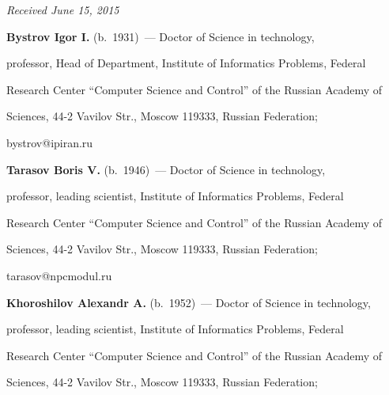 \vspace*{-1pt}





\hfill{\small\textit{Received June 15, 2015}}    


    


\Contr





\noindent


\textbf{Bystrov Igor I.} (b.\ 1931)~--- Doctor of Science in technology, 


professor, Head of Department, Institute of Informatics Problems, Federal 


Research Center ``Computer Science and Control'' of the Russian Academy of 


Sciences, 44-2 Vavilov Str., Moscow 119333, Russian Federation; 


bystrov@ipiran.ru





\vspace*{3pt}





\noindent


\textbf{Tarasov Boris V.} (b.\ 1946)~--- Doctor of Science in technology, 


professor, leading scientist, Institute of Informatics Problems, Federal 


Research Center ``Computer Science and Control'' of the Russian Academy of 


Sciences, 44-2 Vavilov Str., Moscow 119333, Russian Federation; 


tarasov@npcmodul.ru





\vspace*{3pt}





\noindent


\textbf{Khoroshilov Alexandr A.} (b.\ 1952)~--- Doctor of Science in technology, 


professor, leading scientist, Institute of Informatics Problems, Federal 


Research Center ``Computer Science and Control'' of the Russian Academy of 


Sciences, 44-2 Vavilov Str., Moscow 119333, Russian Federation; 


